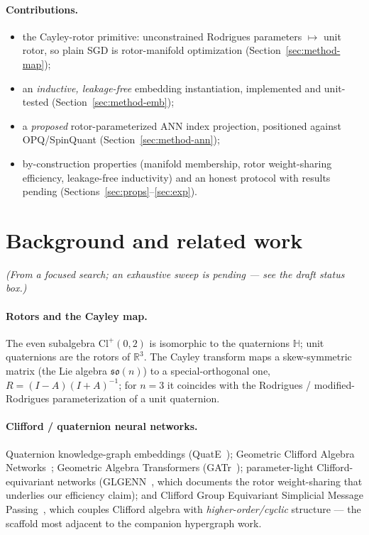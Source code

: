 \documentclass[11pt]{article}
\begin{document}
\paragraph{Contributions.}
\begin{itemize}[nosep]
  \item[\textbf{C1}] the Cayley-rotor primitive: unconstrained Rodrigues parameters
        $\mapsto$ unit rotor, so plain SGD is rotor-manifold optimization
        (Section~\ref{sec:method-map});
  \item[\textbf{C2}] an \emph{inductive, leakage-free} embedding instantiation,
        implemented and unit-tested (Section~\ref{sec:method-emb});
  \item[\textbf{C3}] a \emph{proposed} rotor-parameterized ANN index projection,
        positioned against OPQ/SpinQuant (Section~\ref{sec:method-ann});
  \item[\textbf{C4}] by-construction properties (manifold membership, rotor
        weight-sharing efficiency, leakage-free inductivity) and an honest
        protocol with results pending (Sections~\ref{sec:props}--\ref{sec:exp}).
\end{itemize}

\section{Background and related work}
\label{sec:related}
\emph{(From a focused search; an exhaustive sweep is pending --- see the draft
status box.)}

\paragraph{Rotors and the Cayley map.} The even subalgebra $\mathrm{Cl}^{+}(0,2)$
is isomorphic to the quaternions $\mathbb{H}$; unit quaternions are the rotors of
$\mathbb{R}^3$. The Cayley transform maps a skew-symmetric matrix (the Lie algebra
$\mathfrak{so}(n)$) to a special-orthogonal one, $R=(I-A)(I+A)^{-1}$; for $n=3$ it
coincides with the Rodrigues / modified-Rodrigues parameterization of a unit
quaternion.

\paragraph{Clifford / quaternion neural networks.} Quaternion knowledge-graph
embeddings (QuatE~\cite{zhang2019quate}); Geometric Clifford Algebra
Networks~\cite{ruhe2023gcan}; Geometric Algebra Transformers
(GATr~\cite{brehmer2023gatr}); parameter-light Clifford-equivariant networks
(GLGENN~\cite{filimoshina2025glgenn}, which documents the rotor weight-sharing
that underlies our efficiency claim); and Clifford Group Equivariant Simplicial
Message Passing~\cite{liu2024clifford}, which couples Clifford algebra with
\emph{higher-order/cyclic} structure --- the scaffold most adjacent to the
companion hypergraph work.
\end{document}
